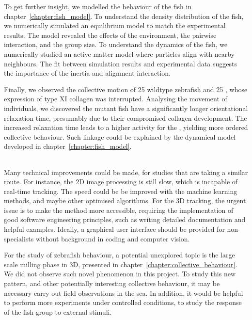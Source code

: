 \documentclass[11pt,twoside]{report}
\begin{document}
To get further insight, we modelled the behaviour of the fish in chapter~\ref{chapter:fish_model}. To understand the density distribution of the fish, we numerically simulated an equilibrium model to match the experimental results. The model revealed the effects of the environment, the pairwise interaction, and the group size. To understand the dynamics of the fish, we numerically studied an active matter model where particles align with nearby neighbours. The fit between simulation results and experimental data suggests the importance of the inertia and alignment interaction.

Finally, we observed the collective motion of 25 wildtype zebrafish and 25 {\mf}, whose expression of type XI collagen was interrupted. Analysing the movement of individuals, we discovered the mutant fish have a significantly longer orientational relaxation time, presumably due to their compromised collagen development. 
The increased relaxation time leads to a higher activity for the {\mf}, yielding more ordered collective behaviour. Such linkage could be explained by the dynamical model developed in chapter~\ref{chapter:fish_model}.

\;\\

Many technical improvements could be made, for studies that are taking a similar route. For instance, the 2D image processing is still slow, which is incapable of real-time tracking. The speed could be be improved with the machine learning methods, and maybe other optimised algorithms.
For the 3D tracking, the urgent issue is to make the method more accessible, requiring the implementation of good software engineering principles, such as writing detailed documentation and helpful examples. Ideally, a graphical user interface should be provided for non-specialists without background in coding and computer vision.

For the study of zebrafish behaviour, a potential unexplored topic is the large scale milling phase in 3D, presented in chapter~\ref{chapter:collective_behaviour}. We did not observe such novel phenomenon in this project. To study this new pattern, and other potentially interesting collective behaviour, it may be necessary carry out field observations in the sea. In addition, it would be helpful to perform more experiments under controlled conditions, to study the response of the fish group to external stimuli.
\end{document}
